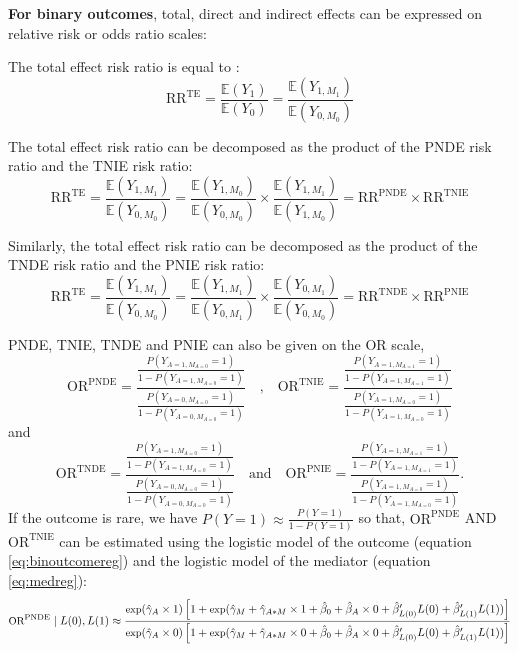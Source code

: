 \documentclass[
]{book}
\begin{document}
\textbf{For binary outcomes}, total, direct and indirect effects can be expressed on relative risk or odds ratio scales:

The total effect risk ratio is equal to :
\[\text{RR}^\text{TE}=\frac{\mathbb{E}(Y_1)}{\mathbb{E}(Y_0)}=\frac{\mathbb{E}(Y_{1,M_1})}{\mathbb{E}(Y_{0,M_0})}\]

The total effect risk ratio can be decomposed as the product of the PNDE risk ratio and the TNIE risk ratio:
\[\text{RR}^\text{TE}=\frac{\mathbb{E}(Y_{1,M_1})}{\mathbb{E}(Y_{0,M_0})}=\frac{\mathbb{E}(Y_{1,M_0})}{\mathbb{E}(Y_{0,M_0})} \times \frac{\mathbb{E}(Y_{1,M_1})}{\mathbb{E}(Y_{1,M_0})}=\text{RR}^\text{PNDE} \times \text{RR}^\text{TNIE}\]

Similarly, the total effect risk ratio can be decomposed as the product of the TNDE risk ratio and the PNIE risk ratio:
\[\text{RR}^\text{TE}=\frac{\mathbb{E}(Y_{1,M_1})}{\mathbb{E}(Y_{0,M_0})}=\frac{\mathbb{E}(Y_{1,M_1})}{\mathbb{E}(Y_{0,M_1})} \times \frac{\mathbb{E}(Y_{0,M_1})}{\mathbb{E}(Y_{0,M_0})}=\text{RR}^\text{TNDE} \times \text{RR}^\text{PNIE}\]

PNDE, TNIE, TNDE and PNIE can also be given on the OR scale,
\[\text{OR}^\text{PNDE} = \frac{\frac{P\left(Y_{A=1,M_{A=0}}=1\right)}{1 - P\left(Y_{A=1,M_{A=0}}=1\right)}}{\frac{P\left(Y_{A=0,M_{A=0}}=1\right)}{1 - P\left(Y_{A=0,M_{A=0}}=1\right)}} \quad \text{,} \quad \text{OR}^\text{TNIE} = \frac{\frac{P\left(Y_{A=1,M_{A=1}}=1\right)}{1 - P\left(Y_{A=1,M_{A=1}}=1\right)}}{\frac{P\left(Y_{A=1,M_{A=0}}=1\right)}{1 - P\left(Y_{A=1,M_{A=0}}=1\right)}}\]
and
\[\text{OR}^\text{TNDE} = \frac{\frac{P\left(Y_{A=1,M_{A=0}}=1\right)}{1 - P\left(Y_{A=1,M_{A=0}}=1\right)}}{\frac{P\left(Y_{A=0,M_{A=0}}=1\right)}{1 - P\left(Y_{A=0,M_{A=0}}=1\right)}} \quad \text{and} \quad \text{OR}^\text{PNIE} = \frac{\frac{P\left(Y_{A=1,M_{A=1}}=1\right)}{1 - P\left(Y_{A=1,M_{A=1}}=1\right)}}{\frac{P\left(Y_{A=1,M_{A=0}}=1\right)}{1 - P\left(Y_{A=1,M_{A=0}}=1\right)}}.\]
If the outcome is rare, we have \(P(Y=1) \approx \frac{P(Y=1)}{1-P(Y=1)}\) so that, \(\text{OR}^{\text{PNDE}}\) AND \(\text{OR}^{\text{TNIE}}\) can be estimated using the logistic model of the outcome (equation \eqref{eq:binoutcomereg}) and the logistic model of the mediator (equation \eqref{eq:medreg}):
\[\small \text{OR}^\text{PNDE} \mid L(0), L(1) \approx \frac{\text{exp}(\hat{\gamma}_A \times 1) \left[ 1 + \text{exp}(\hat{\gamma}_M + \hat{\gamma}_{A \ast M} \times 1 + \hat{\beta}_0  + \hat{\beta}_A \times 0 + \hat{\beta}_{L(0)}^\prime L(0) + \hat{\beta}_{L(1)}^\prime L(1))\right]}{ \text{exp}(\hat{\gamma}_A \times 0) \left[ 1 + \text{exp}(\hat{\gamma}_M + \hat{\gamma}_{A \ast M} \times 0 + \hat{\beta}_0 + \hat{\beta}_A \times 0  + \hat{\beta}_{L(0)}^\prime L(0) + \hat{\beta}_{L(1)}^\prime L(1))\right]} \]
\end{document}
